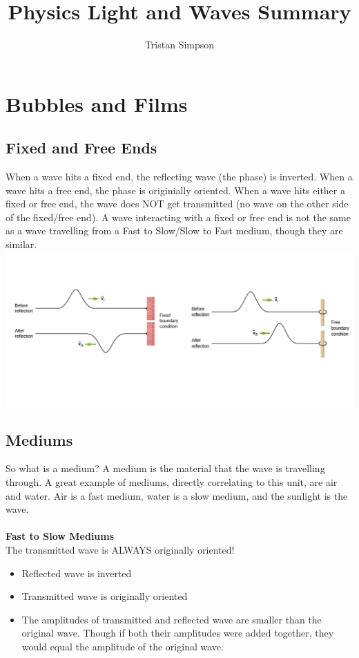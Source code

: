 \documentclass{article}
\title{Physics Light and Waves Summary}
\author{Tristan Simpson}
\begin{document}
\maketitle
\tableofcontents

\vspace{3cm}
\section{Bubbles and Films}
\subsection{Fixed and Free Ends}
When a wave hits a fixed end, the reflecting wave (the phase) is inverted. When a wave hits a free end, the phase is originially oriented. When a wave hits either a fixed or free end, the wave does NOT get transmitted (no wave on the other side of the fixed/free end).
A wave interacting with a fixed or free end is not the same as a wave travelling from a Fast to Slow/Slow to Fast medium, though they are similar.\\
\includegraphics[scale=3]{images/fixed_free_ends}

\vspace{-2cm}

\subsection{Mediums}
So what is a medium? A medium is the material that the wave is travelling through. A great example of mediums, directly correlating to this unit, are air and water. Air is a fast medium, water is a slow medium, and the sunlight is the wave.\\\\
\textbf{Fast to Slow Mediums}\\
The transmitted wave is ALWAYS originally oriented!
\begin{itemize}
    \item Reflected wave is inverted
    \item Transmitted wave is originally oriented
    \item The amplitudes of transmitted and reflected wave are smaller than the original wave. Though if both their amplitudes were added together, they would equal the amplitude of the original wave.
\end{itemize}\leavevmode
\end{document}
